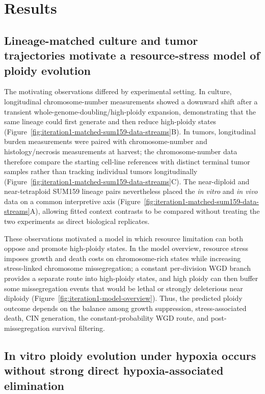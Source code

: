 \documentclass[11pt]{article}
\begin{document}
\section*{Results}



\subsection*{Lineage-matched culture and tumor trajectories motivate a resource-stress model of ploidy evolution}

The motivating observations differed by experimental setting. In culture, longitudinal chromosome-number measurements showed a downward shift after a transient whole-genome-doubling/high-ploidy expansion, demonstrating that the same lineage could first generate and then reduce high-ploidy states (Figure~\ref{fig:iteration1-matched-sum159-data-streams}B). In tumors, longitudinal burden measurements were paired with chromosome-number and histology/necrosis measurements at harvest; the chromosome-number data therefore compare the starting cell-line references with distinct terminal tumor samples rather than tracking individual tumors longitudinally (Figure~\ref{fig:iteration1-matched-sum159-data-streams}C). The near-diploid and near-tetraploid SUM159 lineage pairs nevertheless placed the \textit{in vitro} and \textit{in vivo} data on a common interpretive axis (Figure~\ref{fig:iteration1-matched-sum159-data-streams}A), allowing fitted context contrasts to be compared without treating the two experiments as direct biological replicates.

These observations motivated a model in which resource limitation can both oppose and promote high-ploidy states. In the model overview, resource stress imposes growth and death costs on chromosome-rich states while increasing stress-linked chromosome missegregation; a constant per-division WGD branch provides a separate route into high-ploidy states, and high ploidy can then buffer some missegregation events that would be lethal or strongly deleterious near diploidy (Figure~\ref{fig:iteration1-model-overview}). Thus, the predicted ploidy outcome depends on the balance among growth suppression, stress-associated death, CIN generation, the constant-probability WGD route, and post-missegregation survival filtering.


\subsection*{In vitro ploidy evolution under hypoxia occurs without strong direct hypoxia-associated elimination}
\end{document}

